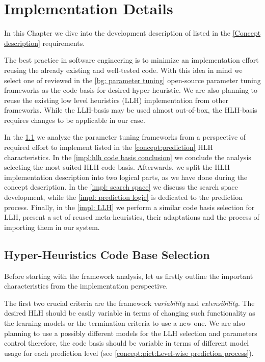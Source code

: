 \chapter{Implementation Details}\label{impl}
In this Chapter we dive into the development description of listed in the \cref{Concept description} requirements.
 
The best practice in software engineering is to minimize an implementation effort reusing the already existing and well-tested code. With this idea in mind we select one of reviewed in the \cref{bg: parameter tuning} open-source parameter tuning frameworks as the code basis for desired hyper-heuristic. We are also planning to reuse the existing low level heuristics (LLH) implementation from other frameworks. While the LLH-basis may be used almost out-of-box, the HLH-basis requires changes to be applicable in our case.

In the \cref{impl:hlh code basis section} we analyze the parameter tuning frameworks from a perspective of required effort to implement listed in the \cref{concept:prediction} HLH characteristics. In the \cref{impl:hlh code basis conclusion} we conclude the analysis selecting the most suited HLH code basis. Afterwards, we split the HLH implementation description into two logical parts, as we have done during the concept description. In the \cref{impl: search space} we discuss the search space development, while the \cref{impl: prediction logic} is dedicated to the prediction process. Finally, in the \cref{impl: LLH} we perform a similar code basis selection for LLH, present a set of reused meta-heuristics, their adaptations and the process of importing them in our system.


\section{Hyper-Heuristics Code Base Selection}\label{impl:hlh code basis section}
Before starting with the framework analysis, let us firstly outline the important characteristics from the implementation perspective.

The first two crucial criteria are the framework \emph{variability} and \emph{extensibility}. The desired HLH should be easily variable in terms of changing such functionality as the learning models or the termination criteria to use a new one. We are also planning to use a possibly different models for the LLH selection and parameters control therefore, the code basis should be variable in terms of different model usage for each prediction level (see \cref{concept:pict:Level-wise prediction process}).

